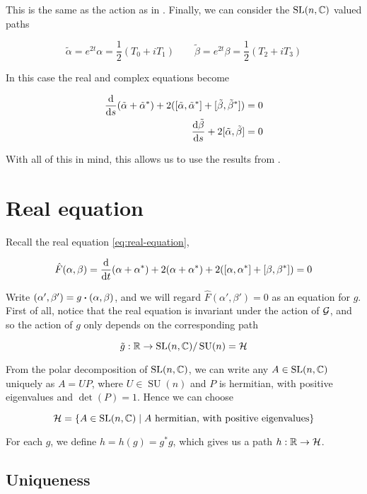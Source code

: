 \documentclass{article}
\DeclareMathOperator{\SU}{SU}
\begin{document}
This is the same as the action as in \cite[Equation 1.6]{donaldson_nahms_1984}. Finally, we can consider the \(\operatorname{SL}(n, \mathbb{C})\) valued paths

\[\tilde\alpha = e^{2t}\alpha = \frac{1}{2}(T_0 + iT_1) \qquad \tilde\beta = e^{2t}\beta = \frac12(T_2 + iT_3)\]

In this case the real and complex equations become

\begin{align}
    \label{eq:nahm-real-equation}
    \dv{s}(\tilde\alpha + \tilde\alpha^*) + 2([\tilde\alpha, \tilde\alpha^*] + [\tilde\beta, \tilde\beta^*]) &= 0 \\
    \dv{\tilde\beta}{s} + 2[\tilde\alpha, \tilde\beta] &= 0 \nonumber
\end{align}

With all of this in mind, this allows us to use the results from \cite{donaldson_nahms_1984}.

\section{Real equation}

Recall the real equation \cref{eq:real-equation},

\[\hat F(\alpha, \beta) = \dv{t}(\alpha + \alpha^*) + 2(\alpha + \alpha^*) + 2([\alpha, \alpha^*] + [\beta, \beta^*]) = 0\]

Write \((\alpha', \beta') = g \vdot (\alpha, \beta)\), and we will regard \(\hat F(\alpha', \beta') = 0\) as an equation for \(g\). First of all, notice that the real equation is invariant under the action of \(\mathcal{G}\), and so the action of \(g\) only depends on the corresponding path

\[\tilde g : \R \to \SL(n, \C) / \SU(n) = \mcH\]

From the polar decomposition of \(\operatorname{SL}(n, \mathbb{C})\), we can write any \(A \in \operatorname{SL}(n, \mathbb{C})\) uniquely as \(A = UP\), where \(U \in \SU(n)\) and \(P\) is hermitian, with positive eigenvalues and \(\det(P) = 1\). Hence we can choose

\[\mathcal{H} = \left\{A \in \operatorname{SL}(n, \mathbb{C}) \mid A \text{ hermitian, with positive eigenvalues}\right\}\]

For each \(g\), we define \(h = h(g) = g^*g\), which gives us a path \(h : \mathbb{R} \to \mathcal{H}\).

\subsection{Uniqueness}
\end{document}
